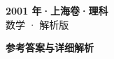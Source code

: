 \documentclass[zihao=-4, a4paper]{ctexart}
\begin{document}
\begin{center}
  {\Large\bfseries 2001 年·上海卷·理科}\\[4pt]
  {\large 数学 · 解析版}
\end{center}
\medskip
{}

\clearpage
{}
\begin{center}{\Large\bfseries 参考答案与详细解析}\end{center}
\medskip

\end{document}
